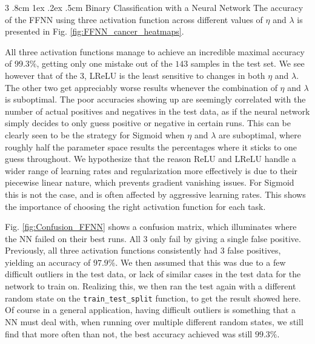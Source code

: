 \documentclass[%
reprint,s
amsmath,amssymb,
aps,
]{revtex4-2}
\makeatletter
\renewcommand{\subsubsection}{%
	\@startsection
	{subsubsection}%
	{3}%
	{\z@}%
	{.8cm \@plus1ex \@minus .2ex}%
	{.5cm}%
	{\normalfont\small\centering}%
}
\makeatother
\begin{document}
\subsubsection{Binary Classification with a Neural Network}  
The accuracy of the FFNN using three activation function across different values of $\eta$ and $\lambda$ is presented in Fig. \ref{fig:FFNN_cancer_heatmaps}. 

All three activation functions manage to achieve an incredible maximal accuracy of $99.3\%$, getting only one mistake out of the $143$ samples in the test set. We see however that of the 3, LReLU is the least sensitive to changes in both $\eta$ and $\lambda$. The other two get appreciably worse results whenever the combination of $\eta$ and $\lambda$ is suboptimal. The poor accuracies showing up are seemingly correlated with the number of actual positives and negatives in the test data, as if the neural network simply decides to only guess positive or negative in certain runs. This can be clearly seen to be the strategy for Sigmoid when $\eta$ and $\lambda$ are suboptimal, where roughly half the parameter space results the percentages where it sticks to one guess throughout. We hypothesize that the reason ReLU and LReLU handle a wider range of learning rates and regularization more effectively is due to their piecewise linear nature, which prevents gradient vanishing issues. For Sigmoid this is not the case, and is often affected by aggressive learning rates. This shows the importance of choosing the right activation function for each task. 

Fig. \ref{fig:Confusion_FFNN} shows a confusion matrix, which illuminates where the NN failed on their best runs. All 3 only fail by giving a single false positive. Previously, all three activation functions consistently had 3 false positives, yielding an accuracy of $97.9\%$. We then assumed that this was due to a few difficult outliers in the test data, or lack of similar cases in the test data for the network to train on. Realizing this, we then ran the test again with a different random state on the \texttt{train\_test\_split} function, to get the result showed here. Of course in a general application, having difficult outliers is something that a NN must deal with, when running over multiple different random states, we still find that more often than not, the best accuracy achieved was still $99.3\%$.
\end{document}
